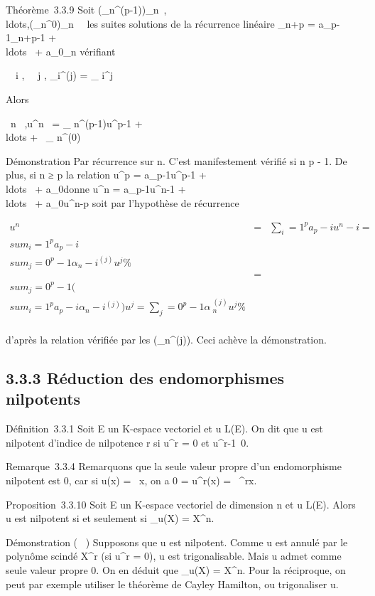 \documentclass[]{article}
\begin{document}
Théorème~3.3.9 Soit
(\alpha_n^(p-1))_n\in{}~,\\ldots,(\alpha_n^0)_n\in{}~~
les suites solutions de la récurrence linéaire \alpha_n+p =
a_p-1\alpha_n+p-1 +
\\ldots~ +
a_0\alpha_n vérifiant

\forall~~i \in [0,p - 1],
\forall~~j \in [0,p - 1],\quad
\alpha_i^(j) = \delta_ i^j

Alors

\forall~n \in {}~,\quad u^n~ =
\alpha_ n^(p-1)u^p-1 +
\\ldots + \alpha~_
n^(0)\mathrmId

Démonstration Par récurrence sur n. C'est manifestement vérifié si n \leq p
- 1. De plus, si n ≥ p la relation u^p =
a_p-1u^p-1 +
\\ldots~ +
a_0\mathrmId donne u^n =
a_p-1u^n-1 +
\\ldots~ +
a_0u^n-p soit par l'hypothèse de récurrence

\begin{align*} u^n& =&
\sum _i=1^pa_
p-iu^n-i = \\sum
_i=1^pa_ p-i \\sum
_j=0^p-1\alpha_ n-i^(j)u^j \%&
\\ & =& \\sum
_j=0^p-1(\\sum
_i=1^pa_
p-i\alpha_n-i^(j))u^j =
\sum _j=0^p-1\alpha~_
n^(j)u^j\%& \\
\end{align*}

d'après la relation vérifiée par les (\alpha_n^(j)). Ceci
achève la démonstration.

\subsection{3.3.3 Réduction des endomorphismes nilpotents}

Définition~3.3.1 Soit E un K-espace vectoriel et u \in L(E). On dit que u
est nilpotent d'indice de nilpotence r si u^r = 0 et
u^r-1\neq~0.

Remarque~3.3.4 Remarquons que la seule valeur propre d'un endomorphisme
nilpotent est 0, car si u(x) = \lambda~x, on a 0 = u^r(x) =
\lambda~^rx.

Proposition~3.3.10 Soit E un K-espace vectoriel de dimension n et u \in
L(E). Alors u est nilpotent si et seulement si \chi_u(X) =
X^n.

Démonstration ( \rigtharrow~) Supposons que u est nilpotent. Comme u est annulé par
le polynôme scindé X^r (si u^r = 0), u est
trigonalisable. Mais u admet comme seule valeur propre 0. On en déduit
que \chi_u(X) = X^n. Pour la réciproque, on peut par
exemple utiliser le théorème de Cayley Hamilton, ou trigonaliser u.
\end{document}
